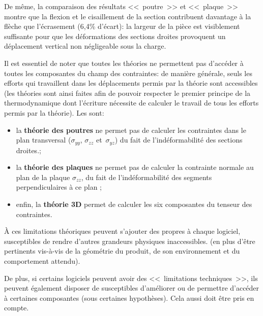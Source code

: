 De même, la comparaison des résultats <<~poutre~>> et <<~plaque~>> montre que la flexion et le
cisaillement de la section contribuent davantage à la flèche que l'écrasement (6,4\% d'écart):
la largeur de la pièce est visiblement suffisante pour que les déformations des sections droites
provoquent un déplacement vertical non négligeable sous la charge.

\medskip
Il est essentiel de noter que toutes les théories ne permettent pas d'accéder à toutes les
composantes du champ des contraintes: de manière générale, seuls les efforts qui travaillent
dans les déplacements permis par la théorie sont accessibles (les théories sont ainsi faites
afin de pouvoir respecter le premier principe de la thermodynamique dont l'écriture nécessite
de calculer le travail de tous les efforts permis par la théorie).
Les  sont:
\begin{itemize}
  \item la \textbf{théorie des poutres} ne permet pas de calculer les contraintes dans le plan
	transversal ($\sigma_{yy}$, $\sigma_{zz}$ et~$\sigma_{yz}$) du fait de l'indéformabilité
	des sections droites.;
  \item la \textbf{théorie des plaques} ne permet pas de calculer la contrainte normale au plan de la plaque
	$\sigma_{zz}$, du fait de l'indéformabilité des segments perpendiculaires à ce plan ;
  \item enfin, la \textbf{théorie 3D} permet de calculer les six composantes du tenseur des contraintes.
\end{itemize}

\medskip
À ces limitations théoriques peuvent s'ajouter des 
propres à chaque logiciel, susceptibles de rendre d'autres grandeurs physiques inaccessibles.
 (en plus d'être pertinents vis-à-vis de la géométrie du produit, de son environnement
et du comportement attendu).

De plus, si certains logiciels peuvent avoir des <<~limitations techniques~>>, ils peuvent
également disposer de  susceptibles d'améliorer
ou de permettre d'accéder à certaines composantes (sous certaines hypothèses). Cela aussi
doit être pris en compte.

\ifVersionAvecExemplesSepares\else
\fi

